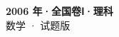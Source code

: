 \documentclass[zihao=-4, a4paper]{ctexart}
\begin{document}
\begin{center}
  {\Large\bfseries 2006 年·全国卷Ⅰ·理科}\\[4pt]
  {\large 数学 · 试题版}
\end{center}
\medskip
{}

\end{document}

